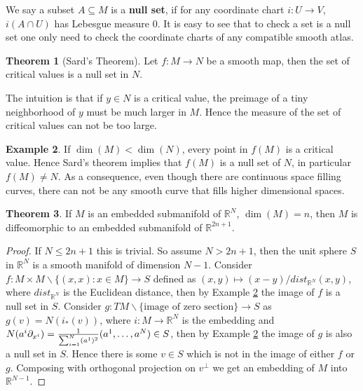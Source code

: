 \documentclass{article}
\theoremstyle{definition}
\newtheorem{thm}{Theorem}[section]
\newtheorem{exm}[thm]{Example}
\begin{document}
We say a subset $A\subseteq M$ is a {\bf null set}, if for any coordinate chart $i: U\rightarrow V$, $i(A\cap U)$ has Lebesgue measure $0$. It is easy to see that to check a set is a null set one only need to check the coordinate charts of any compatible smooth atlas.

\begin{thm}[Sard's Theorem]\label{sard}
    Let $f: M\rightarrow N$ be a smooth map, then the set of critical values is a null set in $N$.
\end{thm}

The intuition is that if $y\in N$ is a critical value, the preimage of a tiny neighborhood of $y$ must be much larger in $M$. Hence the measure of the set of critical values can not be too large.\\

\begin{exm}\label{imgnull}
    If $\dim(M)<\dim(N)$, every point in $f(M)$ is a critical value. Hence Sard's theorem implies that $f(M)$ is a null set of $N$, in particular $f(M)\not=N$. As a consequence, even though there are continuous space filling curves, there can not be any smooth curve that fills higher dimensional spaces.
\end{exm}

\begin{thm}\label{emb0}
    If $M$ is an embedded submanifold of $\mathbb{R}^N$, $\dim(M)=n$, then $M$ is diffeomorphic to an embedded submanifold of $\mathbb{R}^{2n+1}$.
\end{thm}

\begin{proof}
    If $N\leq 2n+1$ this is trivial. So assume $N>2n+1$, then the unit sphere $S$ in $\mathbb{R}^N$ is a smooth manifold of dimension $N-1$. Consider $f: M\times M\backslash \{(x, x): x\in M\}\rightarrow S$ defined as $(x, y)\mapsto (x-y)/dist_{\mathbb{R}^N}(x, y)$, where $dist_{\mathbb{R}^N}$ is the Euclidean distance, then by Example \ref{imgnull} the image of $f$ is a null set in $S$. Consider $g: TM\backslash \{\text{image of zero section}\}\rightarrow S$ as $g(v)=N(i_*(v))$, where $i: M\rightarrow\mathbb{R}^N$ is the embedding and $N(a^i\partial_{x^i})={1\over \sum_{i=1}^N(a^1)^2}(a^1, \dots, a^N)\in S$, then by Example \ref{imgnull} the image of $g$ is also a null set in $S$. Hence there is some $v\in S$ which is not in the image of either $f$ or $g$. Composing with orthogonal projection on $v^\perp$ we get an embedding of $M$ into $\mathbb{R}^{N-1}$. 
\end{proof}
\end{document}
